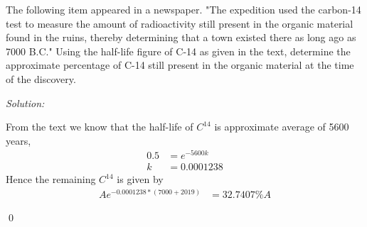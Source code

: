 \documentclass[12pt]{article}
\newenvironment{problem}[2][Problem]{\begin{trivlist}
\item[\hskip \labelsep {\bfseries #1}\hskip \labelsep {\bfseries #2.}]}{\end{trivlist}}
\newenvironment{sol}
    {\emph{Solution:}
    }
    {
    \qed
    }
\begin{document}
\begin{problem}{3}
The following item appeared in a newspaper. "The expedition used the carbon-14 test to measure the amount of radioactivity still present in the organic material found in the ruins, thereby determining that a town existed there as long ago as 7000 B.C." Using the half-life figure of C-14 as given in the text, determine the approximate percentage of C-14 still present in the organic material at the time of the discovery.
\end{problem}
\begin{sol}
From the text we know that the half-life of $C^{14}$ is approximate average of 5600 years, 
\begin{align*}
	0.5 &= e^{-5600k} \\
	k   &= 0.0001238
\end{align*}
Hence the remaining $C^{14}$ is given by
\begin{align*}
	Ae^{-0.0001238*(7000+2019)} &= 32.7407\%A
\end{align*}
\end{sol}












































































\end{document}
